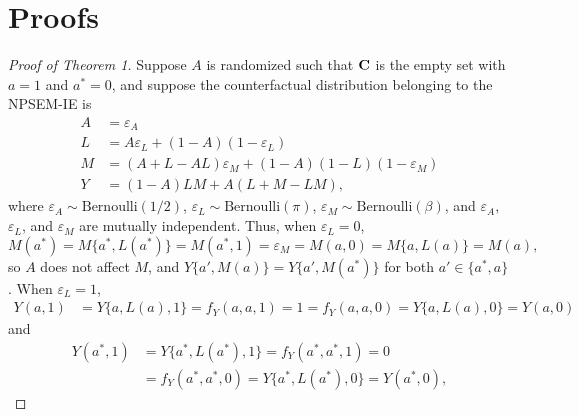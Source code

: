 \documentclass[12pt]{article}
\begin{document}
\section{Proofs}
\begin{proof}[Proof of Theorem 1]
Suppose $A$ is randomized such that ${\bf C}$ is the empty set with $a=1$ and $a^*=0$, 
and suppose the counterfactual distribution belonging to the NPSEM-IE is
\begin{align*}
    A &= \varepsilon_A \\
    L &= A\varepsilon_L + (1-A)(1-\varepsilon_L) \\
    M &= (A+L-AL)\varepsilon_M + (1-A)(1-L)(1-\varepsilon_M) \\
    Y &= (1-A)LM+A(L+M-LM),
\end{align*}
where $\varepsilon_A\sim \text{Bernoulli}(1/2)$, $\varepsilon_L\sim \text{Bernoulli}(\pi)$, $\varepsilon_M\sim \text{Bernoulli}(\beta)$, and $\varepsilon_A$, $\varepsilon_L$, and $\varepsilon_M$ are mutually independent. Thus, when $\varepsilon_L = 0$, 
\[M(a^*)=M\{a^*,L(a^*)\}=M(a^*,1)=\varepsilon_M=M(a,0)=M\{a,L(a)\}=M(a),\] 
so $A$ does not affect $M$, and $Y\{a',M(a)\} = Y\{a',M(a^*)\}$ for both $a'\in\{a^*,a\}$. When $\varepsilon_L = 1$,
\begin{align*}
    Y(a,1) &= Y\{a,L(a),1\} = f_Y(a,a,1) = 1 = f_Y(a,a,0) = Y\{a,L(a),0\} = Y(a,0)
\end{align*}
and
\begin{align*}
    Y(a^*,1) &= Y\{a^*,L(a^*),1\} = f_Y(a^*,a^*,1) = 0\\ 
    &= f_Y(a^*,a^*,0) = Y\{a^*,L(a^*),0\} = Y(a^*,0),
\end{align*}
\begin{comment}
\begin{align*}
    Y\{a,M(a)\}&=f_Y[a,L(a),M\{a,L(a)\}]=f_Y(a,a,\varepsilon_M)=1\\

\end{comment}
\end{proof}
\end{document}
